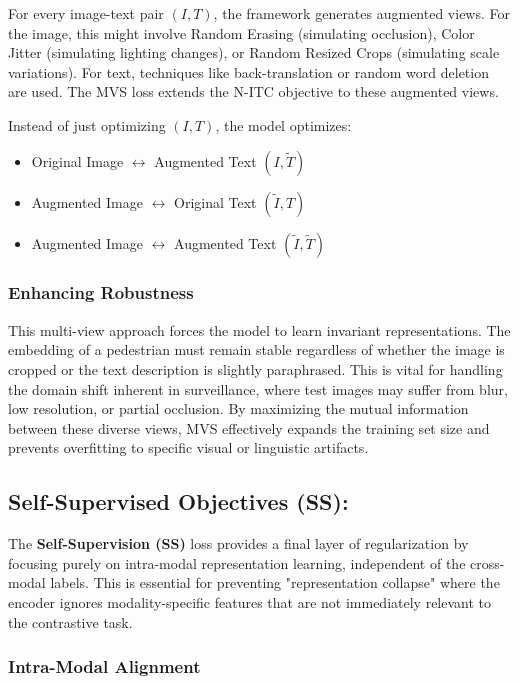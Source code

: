 \documentclass[../main.tex]{subfiles}
\begin{document}
\noindent For every image-text pair $(I, T)$, the framework generates augmented views. For the image, this might involve Random Erasing (simulating occlusion), Color Jitter (simulating lighting changes), or Random Resized Crops (simulating scale variations). For text, techniques like back-translation or random word deletion are used. The MVS loss extends the N-ITC objective to these augmented views.

Instead of just optimizing $(I, T)$, the model optimizes:

\begin{itemize}
    \item Original Image $\leftrightarrow$ Augmented Text $(I, \tilde{T})$
    \item Augmented Image $\leftrightarrow$ Original Text $(\tilde{I}, T)$
    \item Augmented Image $\leftrightarrow$ Augmented Text $(\tilde{I}, \tilde{T})$
\end{itemize}

\subsubsection{Enhancing Robustness}

\noindent This multi-view approach forces the model to learn invariant representations. The embedding of a pedestrian must remain stable regardless of whether the image is cropped or the text description is slightly paraphrased. This is vital for handling the domain shift inherent in surveillance, where test images may suffer from blur, low resolution, or partial occlusion. By maximizing the mutual information between these diverse views, MVS effectively expands the training set size and prevents overfitting to specific visual or linguistic artifacts.

\subsection{Self-Supervised Objectives (SS):}

The \textbf{Self-Supervision (SS)} loss provides a final layer of regularization by focusing purely on intra-modal representation learning, independent of the cross-modal labels. This is essential for preventing "representation collapse" where the encoder ignores modality-specific features that are not immediately relevant to the contrastive task.

\subsubsection{Intra-Modal Alignment}
\end{document}
